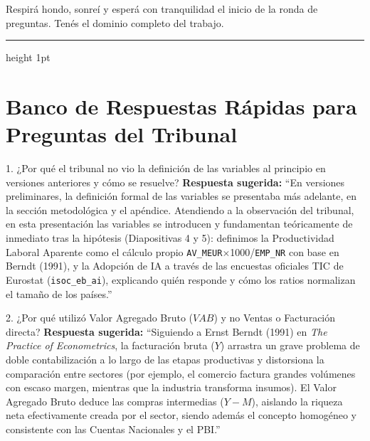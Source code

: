 \documentclass[11pt,a4paper]{article}
\begin{document}
\begin{tipbox}
Respirá hondo, sonreí y esperá con tranquilidad el inicio de la ronda de preguntas. Tenés el dominio completo del trabajo.
\end{tipbox}

\vspace{0.6cm}
\hrule height 1pt
\vspace{0.6cm}

\section*{Banco de Respuestas Rápidas para Preguntas del Tribunal}

\begin{qbox}{1. ¿Por qué el tribunal no vio la definición de las variables al principio en versiones anteriores y cómo se resuelve?}
\textbf{Respuesta sugerida:}  
``En versiones preliminares, la definición formal de las variables se presentaba más adelante, en la sección metodológica y el apéndice. Atendiendo a la observación del tribunal, en esta presentación las variables se introducen y fundamentan teóricamente de inmediato tras la hipótesis (Diapositivas 4 y 5): definimos la Productividad Laboral Aparente como el cálculo propio \texttt{AV\_MEUR}$\times$1000/\texttt{EMP\_NR} con base en Berndt (1991), y la Adopción de IA a través de las encuestas oficiales TIC de Eurostat (\texttt{isoc\_eb\_ai}), explicando quién responde y cómo los ratios normalizan el tamaño de los países.''
\end{qbox}

\vspace{0.2cm}

\begin{qbox}{2. ¿Por qué utilizó Valor Agregado Bruto ($VAB$) y no Ventas o Facturación directa?}
\textbf{Respuesta sugerida:}  
``Siguiendo a Ernst Berndt (1991) en \textit{The Practice of Econometrics}, la facturación bruta ($Y$) arrastra un grave problema de doble contabilización a lo largo de las etapas productivas y distorsiona la comparación entre sectores (por ejemplo, el comercio factura grandes volúmenes con escaso margen, mientras que la industria transforma insumos). El Valor Agregado Bruto deduce las compras intermedias ($Y - M$), aislando la riqueza neta efectivamente creada por el sector, siendo además el concepto homogéneo y consistente con las Cuentas Nacionales y el PBI.''
\end{qbox}
\end{document}
